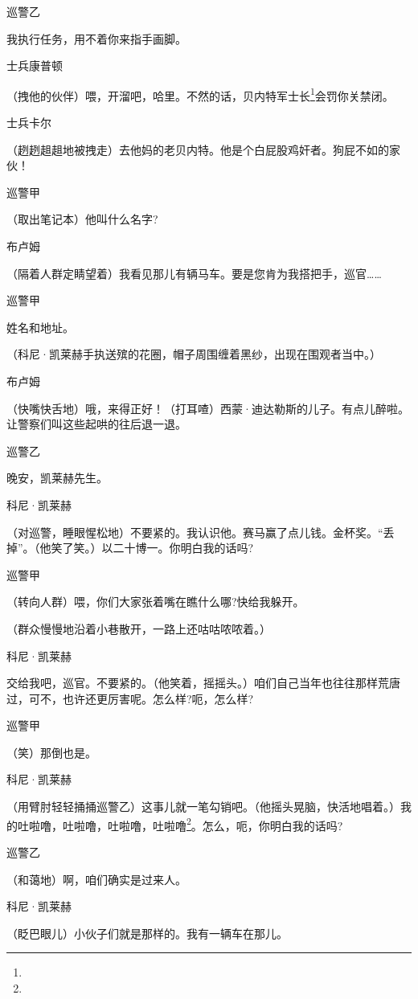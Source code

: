 \par 巡警乙
\par 我执行任务，用不着你来指手画脚。
\par 士兵康普顿
\par （拽他的伙伴）喂，开溜吧，哈里。不然的话，贝内特军士长\footnote{}会罚你关禁闭。
\par 士兵卡尔
\par （趔趔趄趄地被拽走）去他妈的老贝内特。他是个白屁股鸡奸者。狗屁不如的家伙！
\par 巡警甲
\par （取出笔记本）他叫什么名字?
\par 布卢姆
\par （隔着人群定睛望着）我看见那儿有辆马车。要是您肯为我搭把手，巡官……
\par 巡警甲
\par 姓名和地址。
\par （科尼·凯莱赫手执送殡的花圈，帽子周围缠着黑纱，出现在围观者当中。）
\par 布卢姆
\par （快嘴快舌地）哦，来得正好！（打耳喳）西蒙·迪达勒斯的儿子。有点儿醉啦。让警察们叫这些起哄的往后退一退。
\par 巡警乙
\par 晚安，凯莱赫先生。
\par 科尼·凯莱赫
\par （对巡警，睡眼惺松地）不要紧的。我认识他。赛马赢了点儿钱。金杯奖。“丢掉”。（他笑了笑。）以二十博一。你明白我的话吗?
\par 巡警甲
\par （转向人群）喂，你们大家张着嘴在瞧什么哪?快给我躲开。
\par （群众慢慢地沿着小巷散开，一路上还咕咕哝哝着。）
\par 科尼·凯莱赫
\par 交给我吧，巡官。不要紧的。（他笑着，摇摇头。）咱们自己当年也往往那样荒唐过，可不，也许还更厉害呢。怎么样?呃，怎么样?
\par 巡警甲
\par （笑）那倒也是。
\par 科尼·凯莱赫
\par （用臂肘轻轻捅捅巡警乙）这事儿就一笔勾销吧。（他摇头晃脑，快活地唱着。）我的吐啦噜，吐啦噜，吐啦噜，吐啦噜\footnote{}。怎么，呃，你明白我的话吗?
\par 巡警乙
\par （和蔼地）啊，咱们确实是过来人。
\par 科尼·凯莱赫
\par （眨巴眼儿）小伙子们就是那样的。我有一辆车在那儿。
